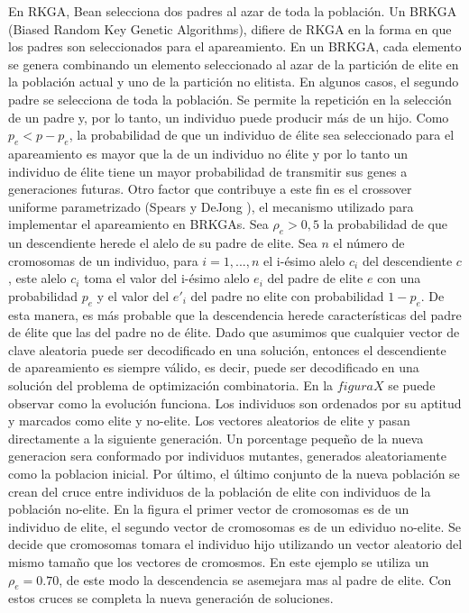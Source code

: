En RKGA, Bean \cite{Bean} selecciona dos padres al azar de toda la población. Un BRKGA (Biased Random Key Genetic Algorithms), difiere de RKGA en la forma en que los padres son seleccionados para el apareamiento. En un BRKGA, cada elemento se genera combinando un elemento seleccionado al azar de la partición de elite en la población actual y uno de la partición no elitista. En algunos casos, el segundo padre se selecciona de toda la población. Se permite la repetición en la selección de un padre y, por lo tanto, un individuo puede producir más de un hijo. Como $p_e < p - p_e$, la probabilidad de que un individuo de élite sea seleccionado para el apareamiento es mayor que la de un individuo no élite y por lo tanto un individuo de élite tiene un mayor probabilidad de transmitir sus genes a generaciones futuras. Otro factor que contribuye a este fin es el crossover uniforme parametrizado (Spears y DeJong \cite{SpearsDeJong}), el mecanismo utilizado para implementar el apareamiento en BRKGAs. Sea $\rho_e > 0,5$ la probabilidad de que un descendiente herede el alelo de su padre de elite. Sea $n$ el número de cromosomas de un individuo, para $i =1,...,n$ el i-ésimo alelo $c_i$ del descendiente $c$, este alelo $c_i$ toma el valor del i-ésimo alelo $e_i$ del padre de elite $e$ con una probabilidad $p_e$ y el valor del $e'_i$ del padre no elite con probabilidad $1-p_e$. De esta manera, es más probable que la descendencia herede características del padre de élite que las del padre no de élite. Dado que asumimos que cualquier vector de clave aleatoria puede ser decodificado en una solución, entonces el descendiente de apareamiento es siempre válido, es decir, puede ser decodificado en una solución del problema de optimización combinatoria.
En la $figura X$ se puede observar como la evolución funciona. Los individuos son ordenados por su aptitud y marcados como elite y no-elite. Los vectores aleatorios de elite y pasan directamente a la siguiente generación. Un porcentage pequeño de la nueva generacion sera conformado por individuos mutantes, generados aleatoriamente como la poblacion inicial. Por último, el último conjunto de la nueva población se crean del cruce entre individuos de la población de elite con individuos de la población no-elite. En la figura el primer vector de cromosomas es de un individuo de elite, el segundo vector de cromosomas es de un edividuo no-elite. Se decide que cromosomas tomara el individuo hijo utilizando un vector aleatorio del mismo tamaño que los vectores de cromosmos. En este ejemplo se utiliza un $\rho_e = 0.70$, de este modo la descendencia se asemejara mas al padre de elite. Con estos cruces se completa la nueva generación de soluciones.


